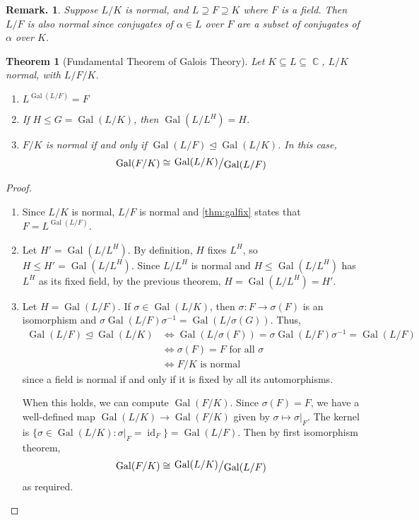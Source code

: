 \documentclass[11pt, a4paper]{memoir}
\DeclareMathOperator{\C}{{\mathbb{C}}}
\theoremstyle{change}
\newtheorem{theorem}{Theorem}[section]
\theoremstyle{plain}
\theoremstyle{nonumberplain}
\newtheorem{remark}{Remark.}
\newtheorem{proof}{Proof}
\DeclareMathOperator{\Gal}{Gal}
\DeclareMathOperator{\id}{id}
\newcommand{\quot}[2]{\mathchoice{\left.\raisebox{0.14em}{$#1$}\middle/\raisebox{-0.14em}{$#2$}\right.}
                                 {\left.\raisebox{0.08em}{$#1$}\middle/\raisebox{-0.08em}{$#2$}\right.}
                                 {\left.\raisebox{0.03em}{$#1$}\middle/\raisebox{-0.03em}{$#2$}\right.}
                                 {\left.\raisebox{0em}{$#1$}\middle/\raisebox{0em}{$#2$}\right.}}
\begin{document}
\begin{remark}
    Suppose $L/K$ is normal, and $L\supseteq F\supseteq K$ where $F$ is a field.
    Then $L/F$ is also normal since conjugates of $\alpha\in L$ over $F$ are a subset of conjugates of $\alpha$ over $K$.
\end{remark}
\begin{theorem}[Fundamental Theorem of Galois Theory]\label{th:ftfg}
    Let $K\subseteq L\subseteq\C$, $L/K$ normal, with $L/F/K$.
    \begin{enumerate}[nolistsep,label=(\roman*)]
        \item $L^{\Gal(L/F)}=F$
        \item If $H\leq G=\Gal(L/K)$, then $\Gal(L/L^H)=H$.
        \item $F/K$ is normal if and only if $\Gal(L/F)\trianglelefteq\Gal(L/K)$.
            In this case,
            \begin{equation*}
                \Gal(F/K)\cong\quot{\Gal(L/K)}{\Gal(L/F)}
            \end{equation*}
    \end{enumerate}
\end{theorem}
\begin{proof}
    \begin{enumerate}[label=(\roman*)]
        \item Since $L/K$ is normal, $L/F$ is normal and \cref{thm:galfix} states that $F=L^{\Gal(L/F)}$.
        \item Let $H'=\Gal(L/L^H)$.
            By definition, $H$ fixes $L^H$, so $H\leq H'=\Gal(L/L^H)$.
            Since $L/L^H$ is normal and $H\leq\Gal(L/L^H)$ has $L^H$ as its fixed field, by the previous theorem, $H=\Gal(L/L^H)=H'$.
        \item Let $H=\Gal(L/F)$.
            If $\sigma\in\Gal(L/K)$, then $\sigma:F\longrightarrow\sigma(F)$ is an isomorphism and $\sigma\Gal(L/F)\sigma^{-1}=\Gal(L/\sigma(G))$.
            Thus,
            \begin{align*}
                \Gal(L/F)\trianglelefteq\Gal(L/K) &\Longleftrightarrow \Gal(L/\sigma(F))=\sigma\Gal(L/F)\sigma^{-1}=\Gal(L/F)\\
                                                  &\Longleftrightarrow \sigma(F)=F\text{ for all }\sigma\\
                                                  &\Longleftrightarrow F/K\text{ is normal}
            \end{align*}
            since a field is normal if and only if it is fixed by all its automorphisms.

            When this holds, we can compute $\Gal(F/K)$.
            Since $\sigma(F)=F$, we have a well-defined map $\Gal(L/K)\to\Gal(F/K)$ given by $\sigma\mapsto\sigma|_F$.
            The kernel is $\{\sigma\in\Gal(L/K):\sigma|_F=\id_F\}=\Gal(L/F)$.
            Then by first isomorphism theorem,
            \begin{equation*}
                \Gal(F/K)\cong\quot{\Gal(L/K)}{\Gal(L/F)}
            \end{equation*}
            as required.
    \end{enumerate}
\end{proof}
\end{document}
